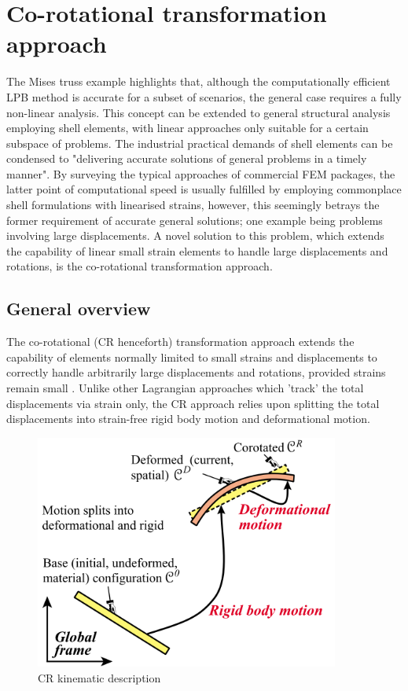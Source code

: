 \section{Co-rotational transformation approach}
The Mises truss example highlights that, although the computationally efficient LPB method is accurate for a subset of scenarios, the general case requires a fully non-linear analysis. This concept can be extended to general structural analysis employing shell elements, with linear approaches only suitable for a certain subspace of problems. The industrial practical demands of shell elements can be condensed to "delivering accurate solutions of general problems in a timely manner". By surveying the typical approaches of commercial FEM packages, the latter point of computational speed is usually fulfilled by employing commonplace shell formulations with linearised strains, however, this seemingly betrays the former requirement of accurate general solutions; one example being problems involving large displacements. A novel solution to this problem, which extends the capability of linear small strain elements to handle large displacements and rotations, is the co-rotational transformation approach.

\subsection{General overview}
The co-rotational (CR henceforth) transformation approach extends the capability of elements normally limited to small strains and  displacements to correctly handle arbitrarily large displacements and rotations, provided strains remain small \cite{FelippaCR1_2016}. Unlike other Lagrangian approaches which 'track' the total displacements via strain only, the CR approach relies upon splitting the total displacements into strain-free rigid body motion and deformational motion.

\begin{figure}[H]
	\centering
	\def\svgwidth{\columnwidth}
	\includegraphics[width=10cm]{images/cr_1.png}
	\caption{CR kinematic description \cite{FelippaCR1_2016}}
	\label{cr1}
\end{figure}

